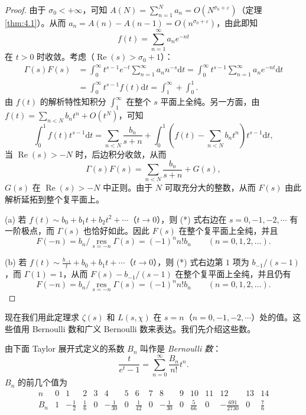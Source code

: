 \begin{proof}
由于 $\sigma_0<+\infty$，可知 $A(N)=\sum_{n=1}^{N}a_n=O(N^{\sigma_0+\varepsilon})$（定理 \ref{thm:4.1}）。从而 $a_n=A(n)-A(n-1)=O(n^{\sigma_0+\varepsilon})$，由此即知
\[
  f(t)=\sum_{n=1}^{\infty}a_ne^{-nt}
\]
在 $t>0$ 时收敛。考虑（$\operatorname{Re}(s)>\sigma_0+1$）：
\begin{align*}
  \Gamma(s)F(s)&=\int_0^{\infty}t^{s-1}e^{-t}\sum_{n=1}^{\infty}a_nn^{-s}\mathrm{d}t
  =\int_0^{\infty}t^{s-1}\sum_{n=1}^{\infty}a_ne^{-nt}\mathrm{d}t\\
  &=\int_0^{\infty}t^{s-1}f(t)\mathrm{d}t=\int_1^{\infty}+\int_0^1.
\end{align*}
由 $f(t)$ 的解析特性知积分 $\int_1^{\infty}$ 在整个 $s$ 平面上全纯。另一方面，由 $f(t)=\sum_{n<N}b_nt^n+O(t^N)$，可知
\[
  \int_0^1f(t)t^{s-1}\mathrm{d}t
  =\sum_{n<N}\frac{b_n}{s+n}+\int_0^1\left(f(t)-\sum_{n<N}b_nt^n\right)t^{s-1}\mathrm{d}t,
\]
当 $\operatorname{Re}(s)>-N$ 时，后边积分收敛，从而
\begin{equation}\tag{*}
  \Gamma(s)F(s)=\sum_{n<N}\frac{b_n}{s+n}+G(s),
\end{equation}
$G(s)$ 在 $\operatorname{Re}(s)>-N$ 中正则。由于 $N$ 可取充分大的整数，从而 $F(s)$ 由此解析延拓到整个复平面上。

(a) 若 $f(t)\sim b_0+b_1t+b_2t^2+\cdots$（$t\to0$），则 (*) 式右边在 $s=0,-1,-2,\cdots$ 有一阶极点，而 $\Gamma(s)$ 也恰好如此。因此 $F(s)$ 在整个复平面上全纯，并且
\[
  F(-n)=b_n/\underset{s=-n}{\operatorname{res}}\Gamma(s)=(-1)^nn!b_n\qquad(n=0,1,2,\dots).
\]

(b) 若 $f(t)\sim\frac{b_{-1}}{t}+b_0+b_1t+\cdots$（$t\to0$），则 (*) 式右边第 $1$ 项为 $b_{-1}/(s-1)$，而 $\Gamma(1)=1$，从而 $F(s)-b_{-1}/(s-1)$ 在整个复平面上全纯，并且仍有
\[
  F(-n)=b_n/\underset{s=-n}{\operatorname{res}}\Gamma(s)=(-1)^nn!b_n\qquad(n=0,1,2,\dots).
\]
\end{proof}

现在我们用此定理求 $\zeta(s)$ 和 $L(s,\chi)$ 在 $s=n$（$n=0,-1,-2,\cdots$）处的值。这些值用 Bernoulli 数和广义 Bernoulli 数来表达。我们先介绍这些数。

\begin{definition}\label{def:ch4-7}
由下面 Taylor 展开式定义的系数 $B_n$ 叫作是 \emph{Bernoulli 数}：
\[
  \frac{t}{e^t-1}=\sum_{n=0}^{\infty}\frac{B_n}{n!}t^n.
\]
$B_n$ 的前几个值为
\[
  \begin{array}{c|ccccccccccccccc}
    n & 0 & 1 & 2 & 3 & 4 & 5 & 6 & 7 & 8 & 9 & 10 & 11 & 12 & 13 & 14\\ \hline
    B_n & 1 & -\frac{1}{2} & \frac{1}{6} & 0 & -\frac{1}{30} & 0 & \frac{1}{42} & 0 & -\frac{1}{30} & 0 & \frac{5}{66} & 0 & -\frac{691}{2730} & 0 & \frac{7}{6}
  \end{array}
\]
\end{definition}

